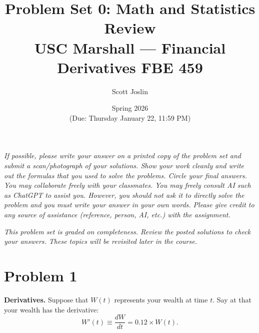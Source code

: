 \documentclass[11pt]{article}
\title{Problem Set 0: Math and Statistics Review \\
       \large USC Marshall --- Financial Derivatives FBE 459}
\author{Scott Joslin}
\date{Spring 2026 \\ (Due: Thursday January 22, 11:59 PM)}
\begin{document}
\maketitle

\noindent\emph{If possible, please write your answer on a printed copy of
the problem set and submit a scan/photograph of your solutions. Show your
work cleanly and write out the formulas that you used to solve the
problems. Circle your final answers. You may collaborate freely with your
classmates. You may freely consult AI such as ChatGPT to assist you.
However, you should not ask it to directly solve the problem and you must
write your answer in your own words. Please give credit to any source of
assistance (reference, person, AI, etc.) with the assignment.}

\medskip

\noindent\emph{This problem set is graded on completeness. Review the
posted solutions to check your answers. These topics will be revisited
later in the course.}

\section*{Problem 1}

\textbf{Derivatives.} Suppose that $W(t)$ represents your wealth at time
$t$. Say at that your wealth has the derivative:
\begin{equation}
  W'(t) \equiv \frac{dW}{dt} = 0.12 \times W(t). \tag{$*$}
\end{equation}
\end{document}
